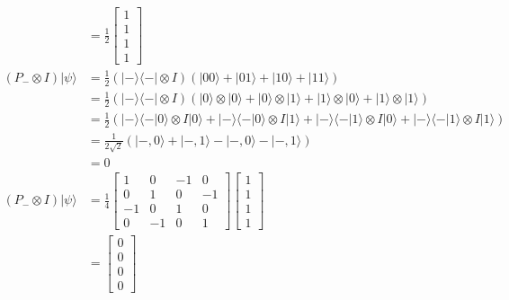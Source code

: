 \documentclass[main.tex]{subfiles}
\begin{document}
\begin{enumerate}
\begin{align*}
                                                    & = \frac{1}{2} \left[\begin{array}{l}1\\1\\1\\1\end{array}\right]\\
        \left(P_{-} \otimes I\right)|\psi\rangle    & = \frac{1}{2}(|-\rangle\langle-|\otimes I)
                                                    (|00\rangle+|01\rangle+|10\rangle+|11\rangle)\\
                                                    & = \frac{1}{2}(|-\rangle\langle-|\otimes I)
                                                    (|0\rangle\otimes|0\rangle + |0\rangle\otimes|1\rangle +
                                                    |1\rangle\otimes|0\rangle + |1\rangle\otimes|1\rangle)\\
                                                    & = \frac{1}{2}(|-\rangle\langle-|0\rangle\otimes I|0\rangle + |-\rangle\langle-|0\rangle\otimes I|1\rangle +
                                                    |-\rangle\langle-|1\rangle\otimes I|0\rangle + 
                                                    |-\rangle\langle-|1\rangle\otimes I|1\rangle)\\
                                                    & = \frac{1}{2\sqrt{2}}(|-,0\rangle + |-,1\rangle - |-,0\rangle - |-,1\rangle)\\
                                                    & = 0\\
        \left(P_{-} \otimes I\right)|\psi\rangle    & = \frac{1}{4}\left[\begin{array}{llll}1&0&-1&0\\0&1&0&-1\\
                                                    -1&0&1&0\\0&-1&0&1\end{array}\right]
                                                    \left[\begin{array}{l}1\\1\\1\\1\end{array}\right]\\
                                                    & = \left[\begin{array}{l}0\\0\\0\\0\end{array}\right]
    \end{align*}


\end{enumerate}
\end{document}
